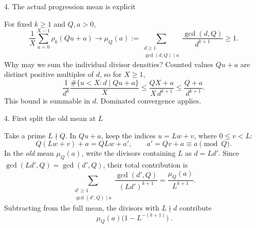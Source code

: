 \documentclass[11pt,aspectratio=169]{beamer}
\begin{document}

\begin{frame}{4. The actual progression mean is explicit}

For fixed $k\ge1$ and $Q,a>0$,
\[
 \frac1X\sum_{u=0}^{X-1}\rho_k(Qu+a)
 \longrightarrow
 \mu_Q(a):=\sum_{\substack{d\ge1\\\gcd(d,Q)\mid a}}
       \frac{\gcd(d,Q)}{d^{k+1}}\ge1.
\]
Why may we sum the individual divisor densities?
Counted values $Qu+a$ are distinct positive multiples of $d$, so for $X\ge1$,
\[
 \frac1{d^k}\frac{\#\{u<X:d\mid Qu+a\}}X
 \le\frac{QX+a}{X\,d^{k+1}}
 \le\frac{Q+a}{d^{k+1}}.
\]
This bound is summable in $d$. Dominated convergence applies.

\end{frame}


\begin{frame}{4. First split the old mean at $L$}

Take a prime $L\nmid Q$. In $Qu+a$, keep the indices $u=Lw+v$,
where $0\le v<L$:
\[
 Q(Lw+v)+a=QLw+a',\qquad a'=Qv+a\equiv a\pmod Q.
\]
In the \emph{old} mean $\mu_Q(a)$, write the divisors containing $L$ as $d=Ld'$.
Since $\gcd(Ld',Q)=\gcd(d',Q)$, their total contribution is
\[
 \sum_{\substack{d'\ge1\\\gcd(d',Q)\mid a}}
       \frac{\gcd(d',Q)}{(Ld')^{k+1}}
 =\frac{\mu_Q(a)}{L^{k+1}}.
\]
Subtracting from the full mean, the divisors with $L\nmid d$ contribute
\[
 \boxed{\ \mu_Q(a)\bigl(1-L^{-(k+1)}\bigr)\ }.
\]

\end{frame}

\end{document}
